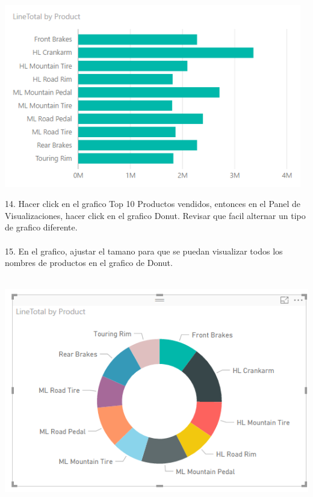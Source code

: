 \documentclass[12pt,letterpaper]{article}
\begin{document}
\begin{center}
\includegraphics[width=13cm]{IMG/29.png} 
\end{center}
14. Hacer click en el grafico Top 10 Productos vendidos, entonces en el Panel de Visualizaciones, hacer click en
el grafico Donut. Revisar que facil alternar un tipo de grafico diferente.\\\\
15. En el grafico, ajustar el tamano para que se puedan visualizar todos los nombres de productos en el grafico
de Donut.\\\\
\begin{center}
\includegraphics[width=14cm]{IMG/30.png} 
\end{center}
\end{document}
